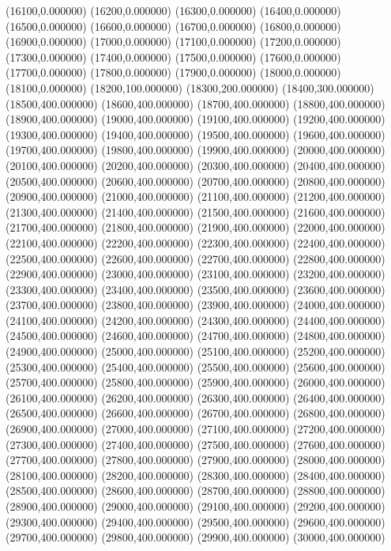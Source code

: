 (16100,0.000000)
(16200,0.000000)
(16300,0.000000)
(16400,0.000000)
(16500,0.000000)
(16600,0.000000)
(16700,0.000000)
(16800,0.000000)
(16900,0.000000)
(17000,0.000000)
(17100,0.000000)
(17200,0.000000)
(17300,0.000000)
(17400,0.000000)
(17500,0.000000)
(17600,0.000000)
(17700,0.000000)
(17800,0.000000)
(17900,0.000000)
(18000,0.000000)
(18100,0.000000)
(18200,100.000000)
(18300,200.000000)
(18400,300.000000)
(18500,400.000000)
(18600,400.000000)
(18700,400.000000)
(18800,400.000000)
(18900,400.000000)
(19000,400.000000)
(19100,400.000000)
(19200,400.000000)
(19300,400.000000)
(19400,400.000000)
(19500,400.000000)
(19600,400.000000)
(19700,400.000000)
(19800,400.000000)
(19900,400.000000)
(20000,400.000000)
(20100,400.000000)
(20200,400.000000)
(20300,400.000000)
(20400,400.000000)
(20500,400.000000)
(20600,400.000000)
(20700,400.000000)
(20800,400.000000)
(20900,400.000000)
(21000,400.000000)
(21100,400.000000)
(21200,400.000000)
(21300,400.000000)
(21400,400.000000)
(21500,400.000000)
(21600,400.000000)
(21700,400.000000)
(21800,400.000000)
(21900,400.000000)
(22000,400.000000)
(22100,400.000000)
(22200,400.000000)
(22300,400.000000)
(22400,400.000000)
(22500,400.000000)
(22600,400.000000)
(22700,400.000000)
(22800,400.000000)
(22900,400.000000)
(23000,400.000000)
(23100,400.000000)
(23200,400.000000)
(23300,400.000000)
(23400,400.000000)
(23500,400.000000)
(23600,400.000000)
(23700,400.000000)
(23800,400.000000)
(23900,400.000000)
(24000,400.000000)
(24100,400.000000)
(24200,400.000000)
(24300,400.000000)
(24400,400.000000)
(24500,400.000000)
(24600,400.000000)
(24700,400.000000)
(24800,400.000000)
(24900,400.000000)
(25000,400.000000)
(25100,400.000000)
(25200,400.000000)
(25300,400.000000)
(25400,400.000000)
(25500,400.000000)
(25600,400.000000)
(25700,400.000000)
(25800,400.000000)
(25900,400.000000)
(26000,400.000000)
(26100,400.000000)
(26200,400.000000)
(26300,400.000000)
(26400,400.000000)
(26500,400.000000)
(26600,400.000000)
(26700,400.000000)
(26800,400.000000)
(26900,400.000000)
(27000,400.000000)
(27100,400.000000)
(27200,400.000000)
(27300,400.000000)
(27400,400.000000)
(27500,400.000000)
(27600,400.000000)
(27700,400.000000)
(27800,400.000000)
(27900,400.000000)
(28000,400.000000)
(28100,400.000000)
(28200,400.000000)
(28300,400.000000)
(28400,400.000000)
(28500,400.000000)
(28600,400.000000)
(28700,400.000000)
(28800,400.000000)
(28900,400.000000)
(29000,400.000000)
(29100,400.000000)
(29200,400.000000)
(29300,400.000000)
(29400,400.000000)
(29500,400.000000)
(29600,400.000000)
(29700,400.000000)
(29800,400.000000)
(29900,400.000000)
(30000,400.000000)
